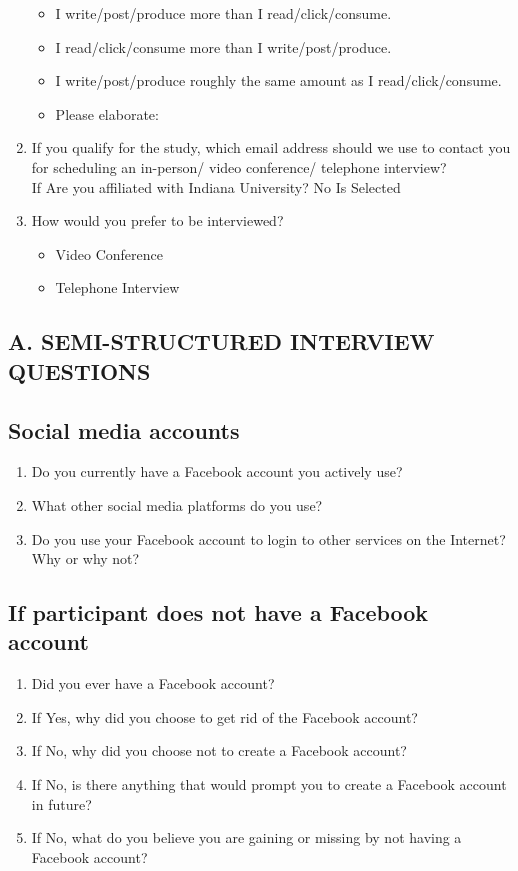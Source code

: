 \begin{enumerate}
\begin{itemize}
\item I write/post/produce more than I read/click/consume.
\item I read/click/consume more than I write/post/produce.
\item I write/post/produce roughly the same amount as I read/click/consume.
\item Please elaborate:
\end{itemize}
\item If you qualify for the study, which email address should we use to contact you for scheduling an in-person/ video conference/ telephone interview?\\
If Are you affiliated with Indiana University? No Is Selected\\
\item How would you prefer to be interviewed?\\
\begin{itemize}
\item Video Conference
\item Telephone Interview
\end{itemize}
\end{enumerate}
\subsection{A. SEMI-STRUCTURED INTERVIEW QUESTIONS}
\subsection{Social media accounts}
\begin{enumerate}
\item Do you currently have a Facebook account you actively use?
\item What other social media platforms do you use?
\item Do you use your Facebook account to login to other services on the Internet? Why or why not?
\end{enumerate}
\subsection{If participant does not have a Facebook account}
\begin{enumerate}
\item Did you ever have a Facebook account?
\item If Yes, why did you choose to get rid of the Facebook account?
\item If No, why did you choose not to create a Facebook account?
\item If No, is there anything that would prompt you to create a Facebook account in future?
\item If No, what do you believe you are gaining or missing by not having a Facebook account?
\end{enumerate}
